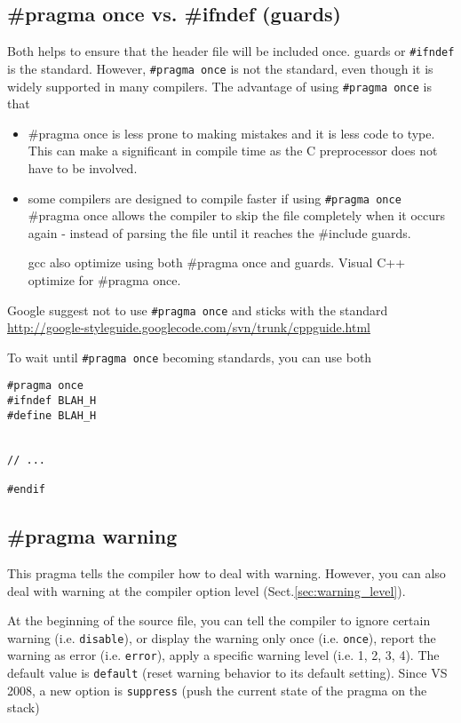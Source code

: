 \subsection{\#pragma once vs. \#ifndef (guards)}
\label{sec:ifndef_pragma-once}

Both helps to ensure that the header file will be included once. 
guards or \verb!#ifndef! is the standard. However,
\verb!#pragma once! is not the standard, even though it is widely supported in
many compilers. The advantage of using \verb!#pragma once! is that
\begin{itemize}
  \item \#pragma once is less prone to making mistakes and it is less code to
  type. This can make a significant in compile time as the C preprocessor does
  not have to be involved.
  
  \item some compilers are designed to compile faster if using \verb!#pragma once!
  \#pragma once allows the compiler to skip the file completely when it occurs
  again - instead of parsing the file until it reaches the \#include guards.
  
  gcc also optimize using both \#pragma once and guards. Visual C++ optimize for
  \#pragma once. 
\end{itemize}

Google suggest not to use \verb!#pragma once! and sticks with the standard
\url{http://google-styleguide.googlecode.com/svn/trunk/cppguide.html}


To wait until \verb!#pragma once! becoming standards, you can use both
\begin{verbatim}
#pragma once
#ifndef BLAH_H
#define BLAH_H


// ...

#endif
\end{verbatim}

\subsection{\#pragma warning}
\label{sec:pragma_warning}

This pragma tells the compiler how to deal with warning. However, you can also
deal with warning at the compiler option level (Sect.\ref{sec:warning_level}).


At the beginning of the source file, you can tell the compiler to ignore certain
warning (i.e. \verb!disable!), or display the warning only once (i.e.
\verb!once!), report the warning as error (i.e. \verb!error!), apply a specific
warning level (i.e. 1, 2, 3, 4).
The default value is \verb!default! (reset warning behavior to its default
setting). Since VS 2008, a new option is \verb!suppress! (push the current state
of the pragma on the stack)

